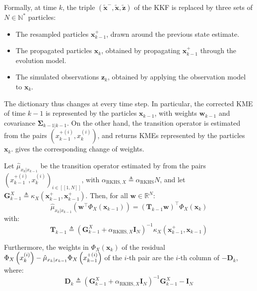 Formally, at time $k$, the triple $\left(\tilde{\mathbf{x}}^-,\tilde{\mathbf{x}},\tilde{\mathbf{z}}\right)$ of the KKF is replaced by three sets of $N\in\mathbb{N}^*$ particles:
\begin{itemize}
	\item The resampled particles $\mathbf{x}_{k-1}^+$, drawn around the previous state estimate.
	\item The propagated particles $\mathbf{x}_k$, obtained by propagating $\mathbf{x}_{k-1}^+$ through the evolution model.
	\item The simulated observations $\mathbf{z}_k$, obtained by applying the observation model to $\mathbf{x}_k$.
\end{itemize}

The dictionary thus changes at every time step. In particular, the corrected KME of time $k-1$ is represented by the particles $\mathbf{x}_{k-1}$, with weights $\mathbf{w}_{k-1}$ and covariance $\boldsymbol{\Sigma}_{k-1|k-1}$. On the other hand, the transition operator is estimated from the pairs $\left(x_{k-1}^{+(i)},x_k^{(i)}\right)$, and returns KMEs represented by the particles $\mathbf{x}_k$.  gives the corresponding change of weights.

\begin{proposition}\label{th:AKKF_prediction}
	Let $\hat{\mu}_{x_k|x_{k-1}}$ be the transition operator estimated by  from the pairs $\left(x_{k-1}^{+(i)},x_k^{(i)}\right)_{i\in[\![1,N]\!]}$, with $\alpha_{\mathrm{RKHS},X}\triangleq\alpha_{\mathrm{RKHS}} N$, and let $\mathbf{G}_{k-1}^X\triangleq \kappa_X\left(\mathbf{x}_{k-1}^+,\mathbf{x}_{k-1}^+\right)$. Then, for all $\mathbf{w}\in\mathbb{R}^N$:
	\begin{equation}
		\hat{\mu}_{x_k|x_{k-1}}\left(\mathbf{w}^\top\Phi_X(\mathbf{x}_{k-1})\right)=(\mathbf{T}_{k-1}\mathbf{w})^\top\Phi_X(\mathbf{x}_k)
	\end{equation}
	with:
	\begin{equation}
		\mathbf{T}_{k-1}\triangleq\left(\mathbf{G}_{k-1}^X+\alpha_{\mathrm{RKHS},X}\mathbf{I}_N\right)^{-1}\kappa_X\left(\mathbf{x}_{k-1}^+,\mathbf{x}_{k-1}\right)
	\end{equation}

	Furthermore, the weights in $\Phi_X(\mathbf{x}_k)$ of the residual $\Phi_X\left(x_k^{(i)}\right)-\hat{\mu}_{x_k|x_{k-1}}\Phi_X\left(x_{k-1}^{+(i)}\right)\hspace{-1pt}$ of the $i$-th pair are the $i$-th column of $-\mathbf{D}_k$, where:
	\begin{equation}
		\mathbf{D}_k\triangleq\left(\mathbf{G}_{k-1}^X+\alpha_{\mathrm{RKHS},X}\mathbf{I}_N\right)^{-1}\mathbf{G}_{k-1}^X-\mathbf{I}_N
	\end{equation}
\end{proposition}


